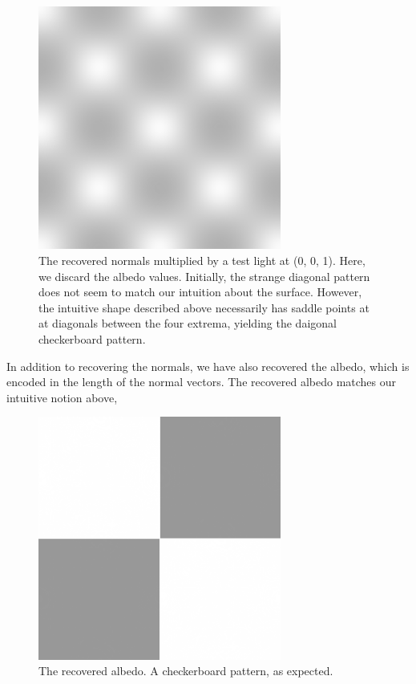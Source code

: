 \documentclass{article}
\begin{document}
\begin{figure}[!ht]
	\centering
	\includegraphics[width=80mm]{figs/q1_test_light_output.png}
	\caption{The recovered normals multiplied by a test light at (0, 0, 1). 
        Here, we discard the albedo values. Initially, the strange diagonal 
        pattern does not seem to match our intuition about the surface. However, 
        the intuitive shape described above necessarily has saddle points at at 
        diagonals between the four extrema, yielding the daigonal checkerboard 
        pattern.}
\end{figure}

In addition to recovering the normals, we have also recovered the albedo, which 
is encoded in the length of the normal vectors. The recovered albedo matches our 
intuitive notion above,

\begin{figure}[!ht]
	\centering
	\includegraphics[width=80mm]{figs/q1_albedo.png}
	\caption{The recovered albedo. A checkerboard pattern, as expected.}
\end{figure}
\end{document}

